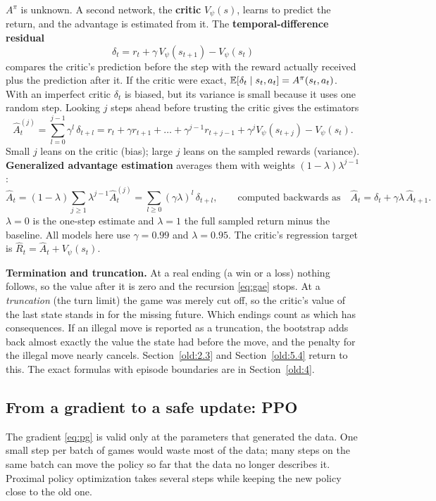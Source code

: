 $A^\pi$ is unknown. A second network, the \textbf{critic} $V_\psi(s)$, learns to predict the return, and the
advantage is estimated from it. The \textbf{temporal-difference residual}
\[
\delta_t = r_t + \gamma\, V_\psi(s_{t+1}) - V_\psi(s_t)
\]
compares the critic's prediction before the step with the reward actually received plus the prediction
after it. If the critic were exact, $\mathbb{E}[\delta_t \mid s_t, a_t] = A^\pi(s_t, a_t)$. With an imperfect critic
$\delta_t$ is biased, but its variance is small because it uses one random step. Looking $j$ steps ahead
before trusting the critic gives the estimators
\[
\hat A^{(j)}_t = \sum_{l=0}^{j-1} \gamma^l\, \delta_{t+l} = r_t + \gamma r_{t+1} + \dots + \gamma^{j-1} r_{t+j-1} + \gamma^{j} V_\psi(s_{t+j}) - V_\psi(s_t).
\]
Small $j$ leans on the critic (bias); large $j$ leans on the sampled rewards (variance).
\textbf{Generalized advantage estimation} averages them with weights $(1-\lambda)\lambda^{j-1}$:
\begin{equation}\label{eq:gae}
\hat A_t = (1 - \lambda) \sum_{j \ge 1} \lambda^{j-1} \hat A^{(j)}_t = \sum_{l \ge 0} (\gamma\lambda)^l\, \delta_{t+l},
\qquad\text{computed backwards as}\quad \hat A_t = \delta_t + \gamma\lambda\, \hat A_{t+1}.
\end{equation}
$\lambda = 0$ is the one-step estimate and $\lambda = 1$ the full sampled return minus the baseline. All
models here use $\gamma = 0.99$ and $\lambda = 0.95$. The critic's regression target is
$\hat R_t = \hat A_t + V_\psi(s_t)$.

\textbf{Termination and truncation.} At a real ending (a win or a loss) nothing follows, so the value after it
is zero and the recursion \eqref{eq:gae} stops. At a \emph{truncation} (the turn limit) the game was merely cut
off, so the critic's value of the last state stands in for the missing future. Which endings count as which
has consequences. If an illegal move is reported as a truncation, the bootstrap adds back almost exactly the
value the state had before the move, and the penalty for the illegal move nearly cancels. Section~\ref{old:2.3}
and Section~\ref{old:5.4} return to this. The exact formulas with episode boundaries are in Section~\ref{old:4}.

\subsection{From a gradient to a safe update: PPO}\label{sec:fp-ppo}

The gradient \eqref{eq:pg} is valid only at the parameters that generated the data. One small step per batch
of games would waste most of the data; many steps on the same batch can move the policy so far that the
data no longer describes it. Proximal policy optimization takes several steps while keeping the new policy
close to the old one.

